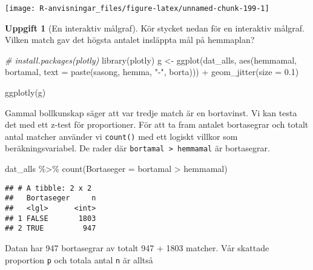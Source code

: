 \documentclass[
]{book}
\newenvironment{Shaded}{\begin{snugshade}}{\end{snugshade}}
\newcommand{\AttributeTok}[1]{\textcolor[rgb]{0.77,0.63,0.00}{#1}}
\newcommand{\CommentTok}[1]{\textcolor[rgb]{0.56,0.35,0.01}{\textit{#1}}}
\newcommand{\FloatTok}[1]{\textcolor[rgb]{0.00,0.00,0.81}{#1}}
\newcommand{\FunctionTok}[1]{\textcolor[rgb]{0.00,0.00,0.00}{#1}}
\newcommand{\NormalTok}[1]{#1}
\newcommand{\OtherTok}[1]{\textcolor[rgb]{0.56,0.35,0.01}{#1}}
\newcommand{\SpecialCharTok}[1]{\textcolor[rgb]{0.00,0.00,0.00}{#1}}
\newcommand{\StringTok}[1]{\textcolor[rgb]{0.31,0.60,0.02}{#1}}
\theoremstyle{definition}
\theoremstyle{definition}
\theoremstyle{definition}
\newtheorem{exercise}{Uppgift}[chapter]
\theoremstyle{definition}
\theoremstyle{remark}
\begin{document}
\begin{center}\texttt{[image: R-anvisningar\_files/figure-latex/unnamed-chunk-199-1]} \end{center}

\begin{exercise}[En interaktiv målgraf]

Kör stycket nedan för en interaktiv målgraf. Vilken match gav det högsta antalet insläppta mål på hemmaplan?

\begin{Shaded}
\begin{Highlighting}[]
\CommentTok{\# install.packages(plotly)}
\FunctionTok{library}\NormalTok{(plotly)}
\NormalTok{g }\OtherTok{\textless{}{-}} \FunctionTok{ggplot}\NormalTok{(dat\_alls, }\FunctionTok{aes}\NormalTok{(hemmamal, bortamal, }\AttributeTok{text =} \FunctionTok{paste}\NormalTok{(sasong, hemma, }\StringTok{"{-}"}\NormalTok{, borta))) }\SpecialCharTok{+}
  \FunctionTok{geom\_jitter}\NormalTok{(}\AttributeTok{size =} \FloatTok{0.1}\NormalTok{)}

\FunctionTok{ggplotly}\NormalTok{(g)}
\end{Highlighting}
\end{Shaded}

\end{exercise}

Gammal bollkunskap säger att var tredje match är en bortavinst. Vi kan testa det med ett z-test för proportioner. För att ta fram antalet bortasegrar och totalt antal matcher använder vi \texttt{count()} med ett logiskt villkor som beräkningsvariabel. De rader där \texttt{bortamal\ \textgreater{}\ hemmamal} är bortasegrar.

\begin{Shaded}
\begin{Highlighting}[]
\NormalTok{dat\_alls }\SpecialCharTok{\%\textgreater{}\%} \FunctionTok{count}\NormalTok{(}\AttributeTok{Bortaseger =}\NormalTok{ bortamal }\SpecialCharTok{\textgreater{}}\NormalTok{ hemmamal)}
\end{Highlighting}
\end{Shaded}

\begin{verbatim}
## # A tibble: 2 x 2
##   Bortaseger     n
##   <lgl>      <int>
## 1 FALSE       1803
## 2 TRUE         947
\end{verbatim}

Datan har 947 bortasegrar av totalt 947 + 1803 matcher. Vår skattade proportion \texttt{p} och totala antal \texttt{n} är alltså
\end{document}

